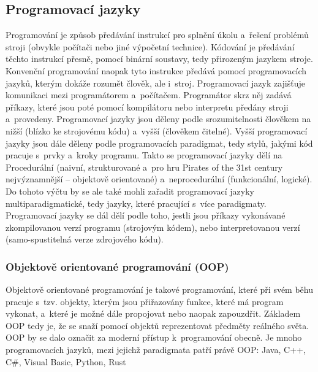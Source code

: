 \documentclass[a4paper]{extarticle}
\begin{document}
\subsection{Programovací jazyky}
Programování je způsob předávání instrukcí pro splnění úkolu a~řešení problémů stroji (obvykle počítači nebo jiné výpočetní technice). Kódování je předávání těchto instrukcí přesně, pomocí binární soustavy, tedy přirozeným jazykem stroje. Konvenční programování naopak tyto instrukce předává pomocí programovacích jazyků, kterým dokáže rozumět člověk, ale i~stroj.
Programovací jazyk zajišťuje komunikaci mezi programátorem a~počítačem. Programátor skrz něj zadává příkazy, které jsou poté pomocí kompilátoru nebo interpretu předány stroji a~provedeny. 
Programovací jazyky jsou děleny podle srozumitelnosti člověkem na nižší (blízko ke strojovému kódu) a~vyšší (člověkem čitelné). 
Vyšší programovací jazyky jsou dále děleny podle programovacích paradigmat, tedy stylů, jakými kód pracuje s~prvky a~kroky programu. Takto se programovací jazyky dělí na Procedurální (naivní, strukturované a~pro hru Pirates of the 31st century nejvýznamnější – objektově orientované) a~neprocedurální (funkcionální, logické). Do tohoto výčtu by se ale také mohli zařadit programovací jazyky multiparadigmatické, tedy jazyky, které pracující s~více paradigmaty.
Programovací jazyky se dál dělí podle toho, jestli jsou příkazy vykonávané zkompilovanou verzí programu (strojovým kódem), nebo interpretovanou verzí (samo-spustitelná verze zdrojového kódu).
\subsubsection{Objektově orientované programování (OOP)}
Objektově orientované programování je takové programování, které při svém běhu pracuje s~tzv. objekty, kterým jsou přiřazovány funkce, které má program vykonat, a~které je možné dále propojovat nebo naopak zapouzdřit. Základem OOP tedy je, že se snaží pomocí objektů reprezentovat předměty reálného světa. OOP by se dalo označit za moderní přístup k~programování obecně.
Je mnoho programovacích jazyků, mezi jejichž paradigmata patří právě OOP: Java, C++, C\#, Visual Basic, Python, Rust
\end{document}
